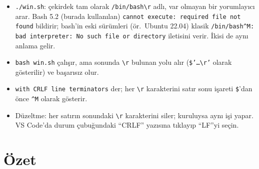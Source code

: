\begin{itemize}
  \item \texttt{./win.sh}: çekirdek tam olarak \texttt{/bin/bash\textbackslash r} adlı, var olmayan bir yorumlayıcı arar. Bash 5.2 (burada kullanılan) \texttt{cannot execute: required file not found} bildirir; bash'in eski sürümleri (ör.\ Ubuntu 22.04) klasik \texttt{/bin/bash\^{}M: bad interpreter: No such file or directory} iletisini verir. İkisi de aynı anlama gelir.
  \item \texttt{bash win.sh} çalışır, ama  sonunda \texttt{\textbackslash r} bulunan yolu alır (\texttt{\$'\ldots\textbackslash r'} olarak gösterilir) ve başarısız olur.
  \item {} \texttt{with CRLF line terminators} der;  her \texttt{\textbackslash r} karakterini satır sonu işareti \texttt{\$}'dan önce \texttt{\^{}M} olarak gösterir.
  \item Düzeltme:  her satırın sonundaki \texttt{\textbackslash r} karakterini siler; kuruluysa  aynı işi yapar. VS Code'da durum çubuğundaki “CRLF” yazısına tıklayıp “LF”yi seçin.
\end{itemize}

\section{Özet}

